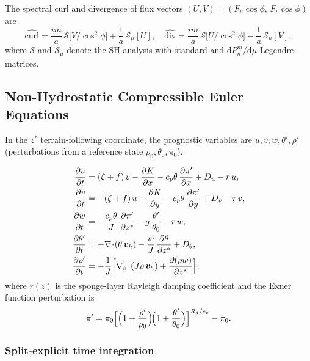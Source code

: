 \documentclass[11pt,a4paper]{article}
\newcommand{\dd}{\mathrm{d}}
\newcommand{\pp}{\partial}
\newcommand{\cpd}{c_p}
\begin{document}
The spectral curl and divergence of flux vectors $(U,V)=(F_u\cos\phi,\,F_v\cos\phi)$ are
\begin{equation}
  \widehat{\text{curl}} = \frac{im}{a}\,\mathcal S\bigl[V/\cos^2\!\phi\bigr] + \frac{1}{a}\,\mathcal S_\mu[U],
  \quad
  \widehat{\text{div}} = \frac{im}{a}\,\mathcal S\bigl[U/\cos^2\!\phi\bigr] - \frac{1}{a}\,\mathcal S_\mu[V],
\end{equation}
where $\mathcal S$ and $\mathcal S_\mu$ denote the SH analysis with standard and $\dd P_n^m/\dd\mu$ Legendre matrices.

\subsection{Non-Hydrostatic Compressible Euler Equations}

In the $z^*$ terrain-following coordinate, the prognostic variables are $u,v,w,\theta',\rho'$ (perturbations from a reference state $\rho_0,\theta_0,\pi_0$).

\begin{align}
  \frac{\pp u}{\pp t} &= (\zeta+f)\,v - \frac{\pp K}{\pp x} - \cpd\theta\,\frac{\pp\pi'}{\pp x} + D_u - r\,u, \label{eq:nh-u}\\
  \frac{\pp v}{\pp t} &= -(\zeta+f)\,u - \frac{\pp K}{\pp y} - \cpd\theta\,\frac{\pp\pi'}{\pp y} + D_v - r\,v, \label{eq:nh-v}\\
  \frac{\pp w}{\pp t} &= -\frac{\cpd\theta}{J}\,\frac{\pp\pi'}{\pp z^*} - g\,\frac{\theta'}{\theta_0} - r\,w, \label{eq:nh-w}\\
  \frac{\pp\theta'}{\pp t} &= -\nabla\!\cdot\!(\theta\,\bm v_h) - \frac{w}{J}\,\frac{\pp\theta}{\pp z^*} + D_\theta, \label{eq:nh-theta}\\
  \frac{\pp\rho'}{\pp t} &= -\frac{1}{J}\Bigl[\nabla_h\!\cdot\!(J\rho\,\bm v_h) + \frac{\pp(\rho w)}{\pp z^*}\Bigr], \label{eq:nh-rho}
\end{align}
where $r(z)$ is the sponge-layer Rayleigh damping coefficient and the Exner function perturbation is
\begin{equation}
  \pi' = \pi_0\Bigl[\Bigl(1+\frac{\rho'}{\rho_0}\Bigr)\!\Bigl(1+\frac{\theta'}{\theta_0}\Bigr)\Bigr]^{R_d/c_v}-\pi_0.
\end{equation}

\subsubsection{Split-explicit time integration}
\end{document}
